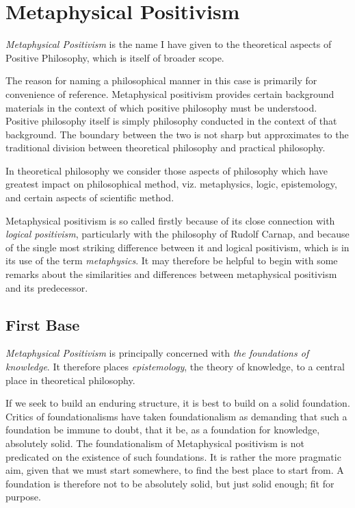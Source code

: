 
\chapter{Metaphysical Positivism}\label{MetaphysicalPositivism}

\emph{Metaphysical Positivism} is
the name I have given to the theoretical aspects of Positive
Philosophy, which is itself of broader scope.

The reason for naming a philosophical manner in this case is
primarily for convenience of reference.
Metaphysical positivism provides certain background materials in the
context of which positive philosophy must be understood.
Positive philosophy itself is simply philosophy conducted in the
context of that background.
The boundary between the two is not sharp but approximates to the
traditional division between theoretical philosophy and practical
philosophy.

In theoretical philosophy we consider those aspects of philosophy
which have greatest impact on philosophical method, viz. metaphysics,
logic, epistemology, and certain aspects of scientific method.

Metaphysical positivism is so called firstly because of its close
connection with \emph{logical positivism}, particularly with the
philosophy of Rudolf Carnap, and because of the single most striking
difference between it and logical positivism, which is in its use of
the term \emph{metaphysics}.
It may therefore be helpful to begin with some remarks about the
similarities and differences between metaphysical positivism and its
predecessor.

\section{First Base}

{\it Metaphysical Positivism} is principally concerned with {\it the
  foundations of knowledge}. 
It therefore places {\it epistemology}, the theory of knowledge, to a
central place in theoretical philosophy. 

If we seek to build an enduring structure, it is best to build on a
solid foundation. 
Critics of foundationalisms have taken foundationalism as demanding
that such a foundation be immune to doubt, that it be, as a foundation
for knowledge, absolutely solid.
The foundationalism of Metaphysical positivism is not predicated on
the existence of such foundations.
It is rather the more pragmatic aim, given that we must start
somewhere, to find the best place to start from.
A foundation is therefore not to be absolutely solid, but just solid
enough; fit for purpose.

